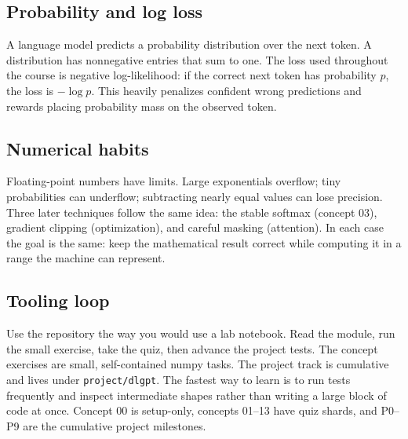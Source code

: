 \subsection*{Probability and log loss}
A language model predicts a probability distribution over the next token. A
distribution has nonnegative entries that sum to one. The loss used throughout
the course is negative log-likelihood: if the correct next token has probability
$p$, the loss is $-\log p$. This heavily penalizes confident wrong predictions
and rewards placing probability mass on the observed token.

\subsection*{Numerical habits}
Floating-point numbers have limits. Large exponentials overflow; tiny
probabilities can underflow; subtracting nearly equal values can lose precision.
Three later techniques follow the same idea: the stable softmax (concept 03),
gradient clipping (optimization), and careful masking (attention). In each case
the goal is the same: keep the mathematical result correct while computing it in
a range the machine can represent.

\subsection*{Tooling loop}
Use the repository the way you would use a lab notebook. Read the module, run
the small exercise, take the quiz, then advance the project tests. The concept
exercises are small, self-contained numpy tasks. The project track is cumulative and lives under
\texttt{project/dlgpt}. The fastest way to learn is to run tests frequently and
inspect intermediate shapes rather than writing a large block of code at once.
Concept 00 is setup-only, concepts 01--13 have quiz shards, and P0--P9 are the
cumulative project milestones.

